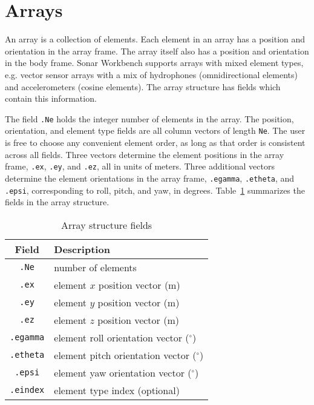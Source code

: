 \section{Arrays}\label{sec:array}

An array is a collection of elements. Each element in an array has a position and orientation in the array frame. The array itself also has a position and orientation in the body frame. Sonar Workbench supports arrays with mixed element types, e.g. vector sensor arrays with a mix of hydrophones (omnidirectional elements) and accelerometers (cosine elements). The array structure has fields which contain this information.

The field \texttt{.Ne} holds the integer number of elements in the array. The position, orientation, and element type fields are all column vectors of length \texttt{Ne}. The user is free to choose any convenient element order, as long as that order is consistent across all fields. Three vectors determine the element positions in the array frame, \texttt{.ex}, \texttt{.ey}, and \texttt{.ez}, all in units of meters. Three additional vectors determine the element orientations in the array frame, \texttt{.egamma}, \texttt{.etheta}, and \texttt{.epsi}, corresponding to roll, pitch, and yaw, in degrees. Table~\ref{tab:ArrayFields} summarizes the fields in the array structure. 

\begin{table}[!ht]
	\begin{center}
		\caption{Array structure fields}
		\label{tab:ArrayFields}
		\begin{tabular}{c|l} 
			\textbf{Field} & \textbf{Description} \\
			\hline
			\texttt{.Ne} & number of elements \\
			\texttt{.ex} & element $x$ position vector (m) \\
			\texttt{.ey} & element $y$ position vector (m) \\
			\texttt{.ez} & element $z$ position vector (m) \\
			\texttt{.egamma} & element roll orientation vector ($^\circ$) \\
			\texttt{.etheta} & element pitch orientation vector ($^\circ$) \\
			\texttt{.epsi} & element yaw orientation vector ($^\circ$) \\
			\texttt{.eindex} & element type index (optional) \\
		\end{tabular}
	\end{center}
\end{table}


